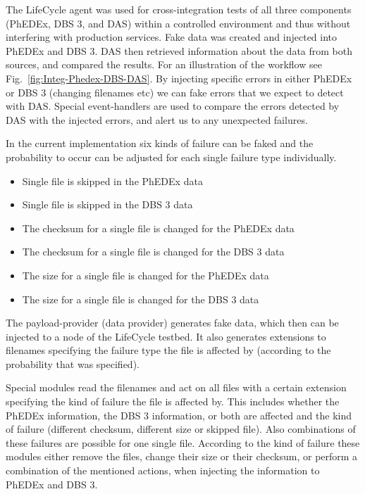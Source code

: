 The LifeCycle agent was used for cross-integration tests of all three
components (PhEDEx, DBS 3, and DAS) within a controlled environment and thus
without interfering with production services. Fake data was created and injected into PhEDEx and DBS 3. DAS then
retrieved information about the data from both sources, and compared the
results. For an illustration of the workflow see Fig.~\ref{fig:Integ-Phedex-DBS-DAS}. By injecting specific errors in either PhEDEx or DBS 3 (changing filenames etc)
we can fake errors that we expect to detect with DAS. Special event-handlers
are used to compare the errors detected by DAS with the injected errors, and
alert us to any unexpected failures.

In the current implementation six kinds of failure can be faked and the probability to occur
can be adjusted for each single failure type individually.

\begin{itemize}
\item Single file is skipped in the PhEDEx data
\item Single file is skipped in the DBS 3 data
\item The checksum for a single file is changed for the PhEDEx data
\item The checksum for a single file is changed for the DBS 3 data
\item The size for a single file is changed for the PhEDEx data
\item The size for a single file is changed for the DBS 3 data
\end{itemize}

The payload-provider (data provider) generates fake data, which then can be
injected to a node of the LifeCycle testbed. It also
generates extensions to filenames specifying the failure type the file is
affected by (according to the probability that was specified).

Special modules read the filenames and act on all files with a certain
extension specifying the kind of failure the file is affected by. This
includes whether the PhEDEx information, the DBS 3 information,
or both are affected and the kind of failure (different checksum, different
size or skipped file). Also combinations of these failures are possible for
one single file. According to the kind of failure these modules either
remove the files, change their size or their checksum, or perform a
combination of the mentioned actions, when injecting the
information to PhEDEx and DBS 3.

